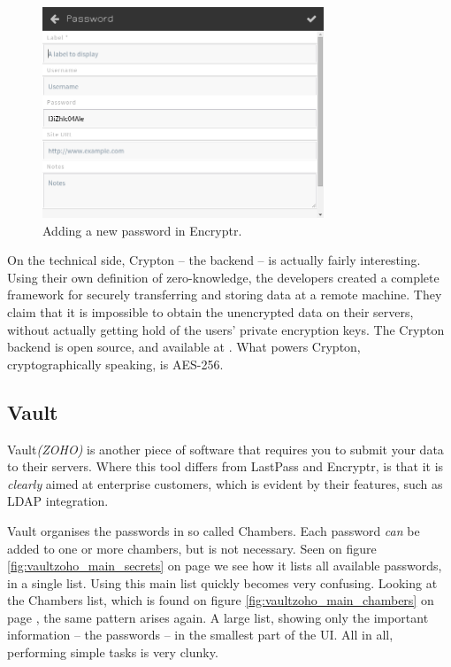 			\begin{figure}[h!]
				\centering
				\includegraphics[width=0.75\textwidth]{figures/analysis/encryptr_newpassword_main.png}
				\caption{Adding a new password in Encryptr.}
				\label{fig:encryptr_newpassword}
			\end{figure}

			On the technical side, Crypton -- the backend -- is actually fairly interesting. Using their own definition of zero-knowledge, the developers created a complete framework for securely transferring and storing data at a remote machine\cite{crypton_paper}. They claim that it is impossible to obtain the unencrypted data on their servers, without actually getting hold of the users' private encryption keys. The Crypton backend is open source, and available at \cite{crypton_git}. What powers Crypton, cryptographically speaking, is AES-256.

		\subsection*{Vault}
			Vault\emph{(ZOHO)}\cite{vault_zoho} is another piece of software that requires you to submit your data to their servers. Where this tool differs from LastPass and Encryptr, is that it is \emph{clearly} aimed at enterprise customers, which is evident by their features, such as LDAP integration.

			Vault organises the passwords in so called Chambers. Each password \emph{can} be added to one or more chambers, but is not necessary. Seen on figure \ref{fig:vaultzoho_main_secrets} on page \pageref{fig:vaultzoho_main_secrets} we see how it lists all available passwords, in a single list. Using this main list quickly becomes very confusing. Looking at the Chambers list, which is found on figure \ref{fig:vaultzoho_main_chambers} on page \pageref{fig:vaultzoho_main_chambers}, the same pattern arises again. A large list, showing only the important information -- the passwords -- in the smallest part of the UI. All in all, performing simple tasks is very clunky.

